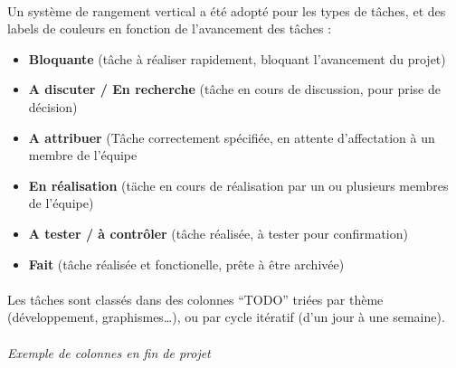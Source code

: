 \paragraph{}
Un système de rangement vertical a été adopté pour les types de tâches, et des labels de couleurs en fonction de l’avancement des tâches :

\begin{itemize}
\item \textbf{Bloquante} (tâche à réaliser rapidement, bloquant l’avancement du projet)
\item \textbf{A discuter / En recherche} (tâche en cours de discussion, pour prise de décision)
\item \textbf{A attribuer} (Tâche correctement spécifiée, en attente d’affectation à un membre de l’équipe
\item \textbf{En réalisation} (täche en cours de réalisation par un ou plusieurs membres de l’équipe)
\item \textbf{A tester / à contrôler} (tâche réalisée, à tester pour confirmation)
\item \textbf{Fait} (tâche réalisée et fonctionelle, prête à être archivée)
\end{itemize}

\paragraph{}
Les tâches sont classés dans des colonnes “TODO” triées par thème (développement, graphismes…), ou par cycle itératif (d’un jour à une semaine).

\paragraph{}
\noindent
{}
\begin{center}
\textit{Exemple de colonnes en fin de projet}
\end{center}

